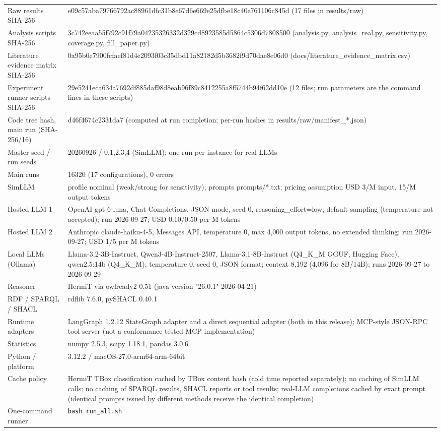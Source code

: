 \begin{table}[H]
\begin{tabularx}{\textwidth}{p{3.6cm}X}
Raw results SHA-256 & e09c57aba79766792ac88961dfc31b8e67d6e669e25dfbe18c40e761106c845d (17 files in results/raw)\\
Analysis scripts SHA-256 & 3c742eeaa55f792c91f79a04235326332d329cd8923585d5864c5306d7808500 (analysis.py, analysis\_real.py, sensitivity.py, coverage.py, fill\_paper.py)\\
Literature evidence matrix SHA-256 & 0a95b0e7900fcfaef81d4e2093f03c35dbd11a82182d5b3682f9d70dae8e06d0 (docs/literature\_evidence\_matrix.csv)\\
Experiment runner scripts SHA-256 & 29e5241eca634a7692df885daf98d8eab96f89c8412255a8f5744b94f62dd10e (12 files; run parameters are the command lines in these scripts)\\
Code tree hash, main run (SHA-256/16) & d46f4674c2331da7 (computed at run completion; per-run hashes in results/raw/manifest\_*.json)\\
Master seed / run seeds & 20260926 / 0,1,2,3,4 (SimLLM); one run per instance for real LLMs\\
Main runs & 16320 (17 configurations), 0 errors\\
SimLLM & profile nominal (weak/strong for sensitivity); prompts prompts/*.txt; pricing assumption USD 3/M input, 15/M output tokens\\
Hosted LLM 1 & OpenAI gpt-6-luna, Chat Completions, JSON mode, seed 0, reasoning\_effort=low, default sampling (temperature not accepted); run 2026-09-27; USD 0.10/0.50 per M tokens\\
Hosted LLM 2 & Anthropic claude-haiku-4-5, Messages API, temperature 0, max 4{,}000 output tokens, no extended thinking; run 2026-09-27; USD 1/5 per M tokens\\
Local LLMs (Ollama) & Llama-3.2-3B-Instruct, Qwen3-4B-Instruct-2507, Llama-3.1-8B-Instruct (Q4\_K\_M GGUF, Hugging Face), qwen2.5:14b (Q4\_K\_M); temperature 0, seed 0, JSON format; context 8{,}192 (4{,}096 for 8B/14B); runs 2026-09-27 to 2026-09-29\\
Reasoner & HermiT via owlready2 0.51 (java version "26.0.1" 2026-04-21)\\
RDF / SPARQL / SHACL & rdflib 7.6.0, pySHACL 0.40.1\\
Runtime adapters & LangGraph 1.2.12 StateGraph adapter and a direct sequential adapter (both in this release); MCP-style JSON-RPC tool server (not a conformance-tested MCP implementation)\\
Statistics & numpy 2.5.3, scipy 1.18.1, pandas 3.0.6\\
Python / platform & 3.12.2 / macOS-27.0-arm64-arm-64bit\\
Cache policy & HermiT TBox classification cached by TBox content hash (cold time reported separately); no caching of SimLLM calls; no caching of SPARQL results, SHACL reports or tool results; real-LLM completions cached by exact prompt (identical prompts issued by different methods receive the identical completion)\\
One-command runner & \texttt{bash run\_all.sh}\\
\bottomrule
\end{tabularx}
\end{table}

